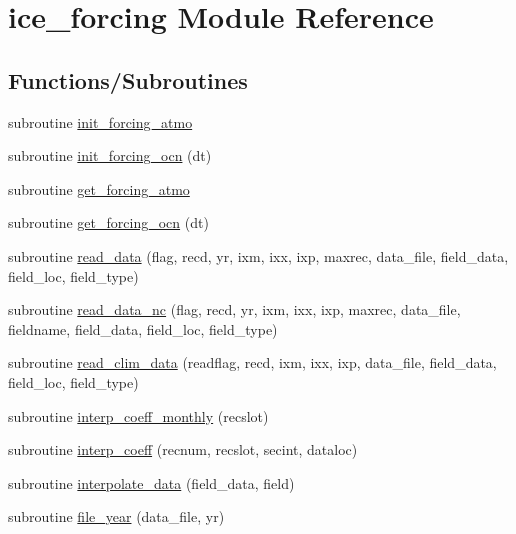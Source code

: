 \hypertarget{namespaceice__forcing}{
\section{ice\_\-forcing Module Reference}
\label{namespaceice__forcing}
}
\subsection*{Functions/Subroutines}
\begin{DoxyCompactItemize}
\item 
subroutine \hyperlink{namespaceice__forcing_aa113a0f4916cea9631de05496daf36c6}{init\_\-forcing\_\-atmo}
\item 
subroutine \hyperlink{namespaceice__forcing_a53be2f27b17125aea7195b3e14874b44}{init\_\-forcing\_\-ocn} (dt)
\item 
subroutine \hyperlink{namespaceice__forcing_ab2f60fb9ecb6411647c4995b88de8732}{get\_\-forcing\_\-atmo}
\item 
subroutine \hyperlink{namespaceice__forcing_a3c95ab18cff7177ae785d882338cd72e}{get\_\-forcing\_\-ocn} (dt)
\item 
subroutine \hyperlink{namespaceice__forcing_a45d48692f330fef1618489012ca9d0a7}{read\_\-data} (flag, recd, yr, ixm, ixx, ixp, maxrec, data\_\-file, field\_\-data, field\_\-loc, field\_\-type)
\item 
subroutine \hyperlink{namespaceice__forcing_a33953eccfa9abefcd935133786fa04b3}{read\_\-data\_\-nc} (flag, recd, yr, ixm, ixx, ixp, maxrec, data\_\-file, fieldname, field\_\-data, field\_\-loc, field\_\-type)
\item 
subroutine \hyperlink{namespaceice__forcing_ae59c1f1aebe7408876c324fd7e2f5e5f}{read\_\-clim\_\-data} (readflag, recd, ixm, ixx, ixp, data\_\-file, field\_\-data, field\_\-loc, field\_\-type)
\item 
subroutine \hyperlink{namespaceice__forcing_a9da649682a06b9b9fb085742a770d940}{interp\_\-coeff\_\-monthly} (recslot)
\item 
subroutine \hyperlink{namespaceice__forcing_a9357ad1d7f2850b9ac32cb5f6b6aa7cb}{interp\_\-coeff} (recnum, recslot, secint, dataloc)
\item 
subroutine \hyperlink{namespaceice__forcing_aaa8b12715d3c39535f631da2fcc76c21}{interpolate\_\-data} (field\_\-data, field)
\item 
subroutine \hyperlink{namespaceice__forcing_a4dc16c54400bfdb9cdf1298aa63d7c0f}{file\_\-year} (data\_\-file, yr)
\item 

\end{DoxyCompactItemize}
